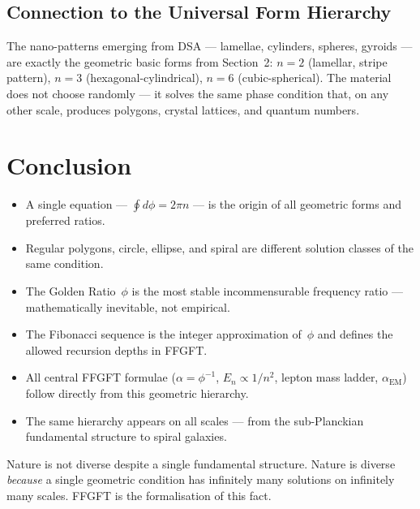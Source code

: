 \subsection{Connection to the Universal Form Hierarchy}

The nano-patterns emerging from DSA — lamellae, cylinders, spheres,
gyroids — are exactly the geometric basic forms from Section~2:
$n=2$ (lamellar, stripe pattern), $n=3$ (hexagonal-cylindrical),
$n=6$ (cubic-spherical). The material does not choose randomly —
it solves the same phase condition that, on any other scale,
produces polygons, crystal lattices, and quantum numbers.

\section{Conclusion}

\begin{itemize}
  \item A single equation — $\oint d\phi = 2\pi n$ — is the
        origin of all geometric forms and preferred ratios.
  \item Regular polygons, circle, ellipse, and spiral are different
        solution classes of the same condition.
  \item The Golden Ratio~$\phi$ is the most stable incommensurable
        frequency ratio — mathematically inevitable, not empirical.
  \item The Fibonacci sequence is the integer approximation of~$\phi$
        and defines the allowed recursion depths in FFGFT.
  \item All central FFGFT formulae ($\alpha = \phi^{-1}$,
        $E_n \propto 1/n^2$, lepton mass ladder, $\alpha_\text{EM}$)
        follow directly from this geometric hierarchy.
  \item The same hierarchy appears on all scales — from the
        sub-Planckian fundamental structure to spiral galaxies.
\end{itemize}

\begin{keybox}
Nature is not diverse despite a single fundamental structure.
Nature is diverse \emph{because} a single geometric condition
has infinitely many solutions on infinitely many scales.
FFGFT is the formalisation of this fact.
\end{keybox}

